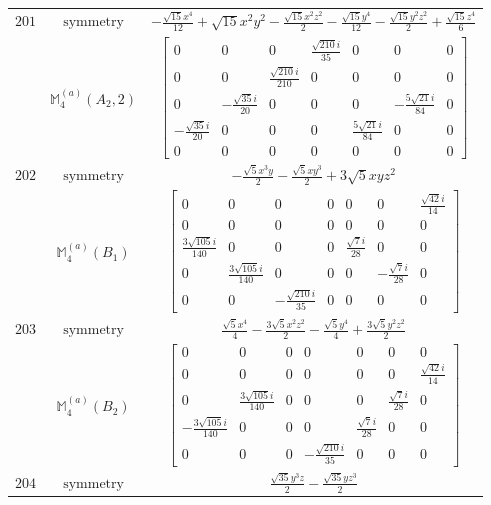 \documentclass[fleqn,8pt,landscape]{jsarticle}
\begin{document}
\begin{longtable}{ccc}
$ 201 $ & $ \text{symmetry} $ & $ - \frac{\sqrt{15} x^{4}}{12} + \sqrt{15} x^{2} y^{2} - \frac{\sqrt{15} x^{2} z^{2}}{2} - \frac{\sqrt{15} y^{4}}{12} - \frac{\sqrt{15} y^{2} z^{2}}{2} + \frac{\sqrt{15} z^{4}}{6} $ \\
$  $ & $ \mathbb{M}_{4}^{(a)}(A_{2},2) $ & $ \begin{bmatrix} 0 & 0 & 0 & \frac{\sqrt{210} i}{35} & 0 & 0 & 0 \\ 0 & 0 & \frac{\sqrt{210} i}{210} & 0 & 0 & 0 & 0 \\ 0 & - \frac{\sqrt{35} i}{20} & 0 & 0 & 0 & - \frac{5 \sqrt{21} i}{84} & 0 \\ - \frac{\sqrt{35} i}{20} & 0 & 0 & 0 & \frac{5 \sqrt{21} i}{84} & 0 & 0 \\ 0 & 0 & 0 & 0 & 0 & 0 & 0 \end{bmatrix} $ \\ \hline
$ 202 $ & $ \text{symmetry} $ & $ - \frac{\sqrt{5} x^{3} y}{2} - \frac{\sqrt{5} x y^{3}}{2} + 3 \sqrt{5} x y z^{2} $ \\
$  $ & $ \mathbb{M}_{4}^{(a)}(B_{1}) $ & $ \begin{bmatrix} 0 & 0 & 0 & 0 & 0 & 0 & \frac{\sqrt{42} i}{14} \\ 0 & 0 & 0 & 0 & 0 & 0 & 0 \\ \frac{3 \sqrt{105} i}{140} & 0 & 0 & 0 & \frac{\sqrt{7} i}{28} & 0 & 0 \\ 0 & \frac{3 \sqrt{105} i}{140} & 0 & 0 & 0 & - \frac{\sqrt{7} i}{28} & 0 \\ 0 & 0 & - \frac{\sqrt{210} i}{35} & 0 & 0 & 0 & 0 \end{bmatrix} $ \\ \hline
$ 203 $ & $ \text{symmetry} $ & $ \frac{\sqrt{5} x^{4}}{4} - \frac{3 \sqrt{5} x^{2} z^{2}}{2} - \frac{\sqrt{5} y^{4}}{4} + \frac{3 \sqrt{5} y^{2} z^{2}}{2} $ \\
$  $ & $ \mathbb{M}_{4}^{(a)}(B_{2}) $ & $ \begin{bmatrix} 0 & 0 & 0 & 0 & 0 & 0 & 0 \\ 0 & 0 & 0 & 0 & 0 & 0 & \frac{\sqrt{42} i}{14} \\ 0 & \frac{3 \sqrt{105} i}{140} & 0 & 0 & 0 & \frac{\sqrt{7} i}{28} & 0 \\ - \frac{3 \sqrt{105} i}{140} & 0 & 0 & 0 & \frac{\sqrt{7} i}{28} & 0 & 0 \\ 0 & 0 & 0 & - \frac{\sqrt{210} i}{35} & 0 & 0 & 0 \end{bmatrix} $ \\ \hline
$ 204 $ & $ \text{symmetry} $ & $ \frac{\sqrt{35} y^{3} z}{2} - \frac{\sqrt{35} y z^{3}}{2} $ \\

\end{longtable}
\end{document}
